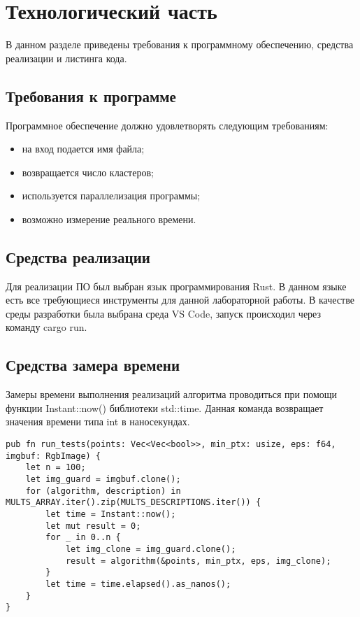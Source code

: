 \chapter{Технологический часть}

В данном разделе приведены требования к программному обеспечению, средства реализации и листинга кода.

\section{Требования к программе}

Программное обеспечение должно удовлетворять следующим требованиям:
\begin{itemize}
	\item на вход подается имя файла;
	\item возвращается число кластеров;
	\item используется параллелизация программы;
	\item возможно измерение реального времени.
\end{itemize}

\section{Средства реализации} 
Для реализации ПО был выбран язык программирования Rust\cite{python}. 
В данном языке есть все требующиеся инструменты для данной лабораторной работы.
В качестве среды разработки была выбрана среда VS Code\cite{vscode}, запуск происходил через команду cargo run.

\section{Средства замера времени}

Замеры времени выполнения реализаций алгоритма проводиться при помощи функции Instant::now() \cite{test} библиотеки std::time. 
Данная команда возвращает значения  времени типа int в наносекундах.

\newpage

\begin{lstlisting}[label=bench,caption=Пример замера затраченного времени]
pub fn run_tests(points: Vec<Vec<bool>>, min_ptx: usize, eps: f64, imgbuf: RgbImage) {
	let n = 100;
	let img_guard = imgbuf.clone();
	for (algorithm, description) in MULTS_ARRAY.iter().zip(MULTS_DESCRIPTIONS.iter()) {
		let time = Instant::now();
		let mut result = 0;
		for _ in 0..n {
			let img_clone = img_guard.clone();
			result = algorithm(&points, min_ptx, eps, img_clone);
		}
		let time = time.elapsed().as_nanos();
	}
}
\end{lstlisting}



